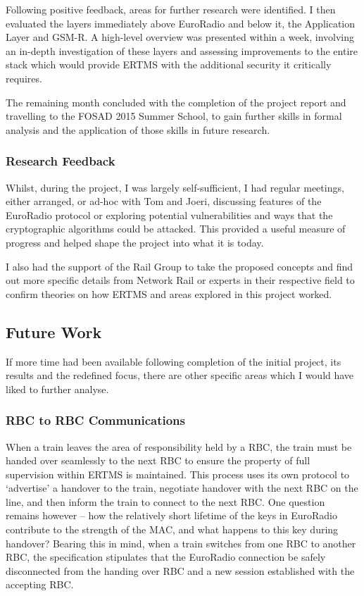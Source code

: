 \documentclass[twoside,11pt,a4paper]{article}
\begin{document}
Following positive feedback, areas for further research were identified. I then evaluated the layers immediately above EuroRadio and below it, the Application Layer and GSM-R. A high-level overview was presented within a week, involving an in-depth investigation of these layers and assessing improvements to the entire stack which would provide ERTMS with the additional security it critically requires.

The remaining month concluded with the completion of the project report and travelling to the FOSAD 2015 Summer School, to gain further skills in formal analysis and the application of those skills in future research.

\subsubsection{Research Feedback}
Whilst, during the project, I was largely self-sufficient, I had regular meetings, either arranged, or ad-hoc with Tom and Joeri, discussing features of the EuroRadio protocol or exploring potential vulnerabilities and ways that the cryptographic algorithms could be attacked. This provided a useful measure of progress and helped shape the project into what it is today.

I also had the support of the Rail Group to take the proposed concepts and find out more specific details from Network Rail or experts in their respective field to confirm theories on how ERTMS and areas explored in this project worked.

\subsection{Future Work}
If more time had been available following completion of the initial project, its results and the redefined focus, there are other specific areas which I would have liked to further analyse.

\subsubsection{RBC to RBC Communications}
When a train leaves the area of responsibility held by a RBC, the train must be handed over seamlessly to the next RBC to ensure the property of full supervision within ERTMS is maintained. This process uses its own protocol to `advertise' a handover to the train, negotiate handover with the next RBC on the line, and then inform the train to connect to the next RBC. One question remains however -- how the relatively short lifetime of the keys in EuroRadio contribute to the strength of the MAC, and what happens to this key during handover? Bearing this in mind, when a train switches from one RBC to another RBC, the specification stipulates that the EuroRadio connection be safely disconnected from the handing over RBC and a new session established with the accepting RBC. 
\end{document}
